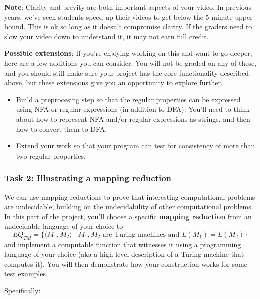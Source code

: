 {\bf Note}: Clarity and brevity are both important aspects of your video.  In previous years, we've seen 
students speed up their videos to get below the 5 minute upper bound. This is ok so long as it doesn't 
compromise clarity. If the graders need to slow your video down to understand
it, it may not earn full credit.



{\bf Possible extensions}: If you're enjoying working on this and want to go deeper, here are a few additions you can consider. You will not be graded on any of these, and you should still make sure your project has the core functionality described above, but these extensions give you an opportunity to explore further.
\begin{itemize}
   \item Build a preprocesing step so that the regular properties can be expressed using NFA or regular expressions (in addition to DFA). You'll need to think about how to represent NFA and/or regular expressions as strings, and then how to convert them to DFA.
   \item Extend your work so that your program can test for consistency of more than two regular properties.
\end{itemize}

\newpage
\subsubsection*{Task 2: Illustrating a mapping reduction}

We can use mapping reductions to prove that interesting computational 
problems are undecidable, building on 
the undecidability of other computational problems.
In this part of the project, you'll choose a specific {\bf mapping reduction}
from an undecidable language of your choice to 
$$EQ_{TM} = \{ \langle M_1, M_2 \rangle \mid M_1, M_2 \text{ are Turing machines and } L(M_1) = L(M_2) \}$$
and implement a computable function that witnesses it
using a  programming language of your choice (aka a high-level description of a Turing machine that computes it).
You will then demonstrate  how your construction works for some test examples.

Specifically:

\vspace{-20pt}

